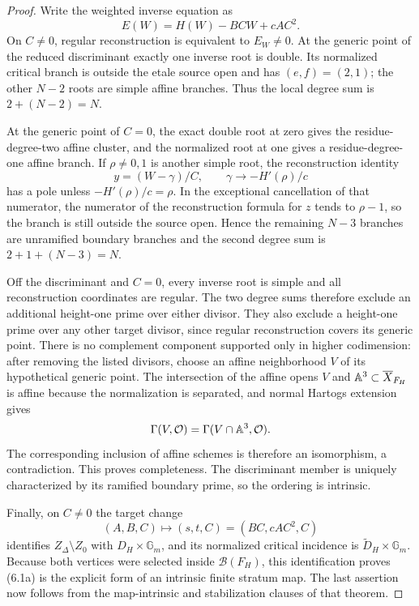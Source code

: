 \begin{proof}
Write the weighted inverse equation as
\[
 E(W)=H(W)-BCW+cAC^2.
\]
On $C\ne0$, regular reconstruction is equivalent to $E_W\ne0$.  At the
generic point of the reduced discriminant exactly one inverse root is double.
Its normalized critical branch is outside the etale source open and has
$(e,f)=(2,1)$; the other $N-2$ roots are simple affine branches.  Thus the
local degree sum is $2+(N-2)=N$.

At the generic point of $C=0$, the exact double root at zero gives the
residue-degree-two affine cluster, and the normalized root at one gives a
residue-degree-one affine branch.  If $\rho\ne0,1$ is another simple root,
the reconstruction identity
\[
 y=(W-\gamma)/C,
 \qquad \gamma\longrightarrow-H'(\rho)/c
\]
has a pole unless $-H'(\rho)/c=\rho$.  In the exceptional cancellation of
that numerator, the numerator of the reconstruction formula for $z$ tends
to $\rho-1$, so the branch is still outside the source open.  Hence the
remaining $N-3$ branches are unramified boundary branches and the second
degree sum is $2+1+(N-3)=N$.

Off the discriminant and $C=0$, every inverse root is simple and all
reconstruction coordinates are regular.  The two degree sums therefore
exclude an additional height-one prime over either divisor.  They also
exclude a height-one prime over any other target divisor, since regular
reconstruction covers its generic point.  There is no complement component
supported only in higher codimension: after removing the listed divisors,
choose an affine neighborhood $V$ of its hypothetical generic point.  The
intersection of the affine opens $V$ and $\mathbb A^3\subset\overline X_{F_H}$ is
affine because the normalization is separated, and normal Hartogs extension
gives
\[
 \Gamma(V,\mathcal O)=
 \Gamma(V\cap\mathbb A^3,\mathcal O).
\]
The corresponding inclusion of affine schemes is therefore an isomorphism,
a contradiction.  This proves completeness.  The discriminant member is
uniquely characterized by its ramified boundary prime, so the ordering is
intrinsic.

Finally, on $C\ne0$ the target change
\[
 (A,B,C)\longmapsto(s,t,C)=(BC,cAC^2,C)
\]
identifies $Z_\Delta\setminus Z_0$ with
$D_H\times\mathbb G_m$, and its normalized critical incidence is
$\widetilde D_H\times\mathbb G_m$.  Because both vertices were selected
inside $\mathcal B(F_H)$, this identification proves (6.1a) is the explicit
form of an intrinsic finite stratum map.  The last assertion now follows
from the map-intrinsic and stabilization clauses of that theorem.
\end{proof}

